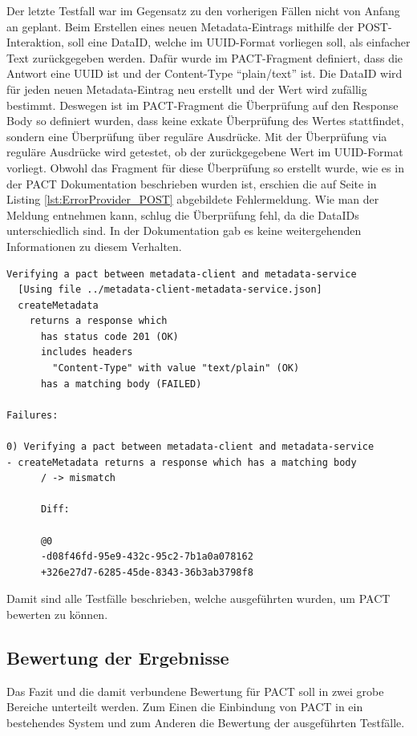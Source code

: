 \documentclass{llncs}
\begin{document}
Der letzte Testfall war im Gegensatz zu den vorherigen Fällen nicht von Anfang an geplant. Beim Erstellen eines neuen Metadata-Eintrags mithilfe der POST-Interaktion, soll eine DataID, welche im UUID-Format vorliegen soll, als einfacher Text zurückgegeben werden. Dafür wurde im PACT-Fragment definiert, dass die Antwort eine UUID ist und der Content-Type \enquote{plain/text} ist. Die DataID wird für jeden neuen Metadata-Eintrag neu erstellt und der Wert wird zufällig bestimmt. Deswegen ist im PACT-Fragment die Überprüfung auf den Response Body so definiert wurden, dass keine exkate Überprüfung des Wertes stattfindet, sondern eine Überprüfung über reguläre Ausdrücke.  Mit der Überprüfung via reguläre Ausdrücke wird getestet, ob der zurückgegebene Wert im UUID-Format vorliegt. Obwohl das Fragment für diese Überprüfung so erstellt wurde, wie es in der PACT Dokumentation beschrieben wurden ist, erschien die auf Seite \pageref{lst:ErrorProvider_POST} in Listing \ref{lst:ErrorProvider_POST} abgebildete Fehlermeldung. Wie man der Meldung entnehmen kann, schlug die Überprüfung fehl, da die DataIDs unterschiedlich sind. In der Dokumentation gab es keine weitergehenden Informationen zu diesem Verhalten.

\begin{lstlisting}[caption=Fehler in PACT,label={lst:ErrorProvider_POST}]
Verifying a pact between metadata-client and metadata-service
  [Using file ../metadata-client-metadata-service.json]
  createMetadata
    returns a response which
      has status code 201 (OK)
      includes headers
        "Content-Type" with value "text/plain" (OK)
      has a matching body (FAILED)

Failures:

0) Verifying a pact between metadata-client and metadata-service 
- createMetadata returns a response which has a matching body
      / -> mismatch

      Diff:

      @0
      -d08f46fd-95e9-432c-95c2-7b1a0a078162
      +326e27d7-6285-45de-8343-36b3ab3798f8
\end{lstlisting}

Damit sind alle Testfälle beschrieben, welche ausgeführten wurden, um PACT bewerten zu können.

\subsection{Bewertung der Ergebnisse}
Das Fazit und die damit verbundene Bewertung für PACT soll in zwei grobe Bereiche unterteilt werden. Zum Einen die Einbindung von PACT in ein bestehendes System und zum Anderen die Bewertung der ausgeführten Testfälle.
\end{document}
